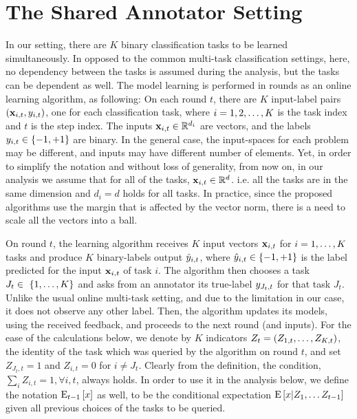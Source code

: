 \chapter{The Shared Annotator Setting}


In our setting, there are $K$  binary classification tasks to be learned simultaneously. 
In opposed to the common multi-task classification settings, here, no dependency between the tasks 
is assumed during the analysis, but the tasks can be dependent as well. 
The model learning is performed in rounds as an online learning algorithm, as following: 
On each round $t$, there are $K$ input-label pairs
$(\mathbf{x}_{i,t},y_{i,t})$, one for each classification task, where $i=1,2, \ldots , K$ is the task index and $t$ is the 
step index. The inputs $\mathbf{x}_{i,t}\in\mathbb{R}^{d_i}$ are vectors, and the labels  $y_{i,t}\in\{-1,+1\}$ are binary. 
In the general case, the input-spaces for each problem may be different, and inputs may
have different number of elements. Yet, in order to  simplify the notation and without loss of generality,  
from now on, in our analysis we assume that for all of the tasks, $\mathbf{x}_{i,t}\in\mathbb{R}^{d}$. 
i.e. all the tasks are in the same dimension and $d_i = d$ holds for all tasks.
In practice, since the proposed algorithms use the margin that is affected by the vector norm, 
there is a need to scale all the vectors into a ball.


On round $t$, the learning algorithm receives $K$ input vectors $\mathbf{x}_{i,t}$
for $i=1 , \ldots , K$ tasks and produce  $K$  binary-labels output $\hat{y}_{i,t}$, where
$\hat{y}_{i,t}\in\{-1,+1\}$ is the label predicted for the input
$\mathbf{x}_{i,t}$ of task $i$. The algorithm then chooses a task $J_t \in\
\{1 , \ldots , K\}$ and asks from an annotator its true-label
$y_{J_t,t}$ for that task $J_t$. Unlike the usual online multi-task setting, and due to the limitation in our
case, it  does not observe any other label. 
Then, the algorithm updates its models, using the received feedback, and proceeds to the
next round (and inputs).  
For the ease of the calculations below, we denote by $K$ indicators 
$Z_t=\left({ Z_{1,t} , \ldots , Z_{K,t}}\right)$, the identity of the task which was queried by the algorithm
on round $t$, and set $Z_{J_t,t}=1$  and $Z_{i,t}=0$ for $i\ne J_t$. 
Clearly from the definition, the condition, $\sum_i{Z_{i,t}=1} ,\forall{i,t}$, always holds. 
In order to use it in the analysis below, we define the notation ${\rm E}_{t-1}\left[{x}\right]$ as well, to be the
conditional expectation ${\rm E}\left[{x \vert Z_{1},\ldots Z_{t-1}}\right]$ given all previous choices of the tasks to be queried.


